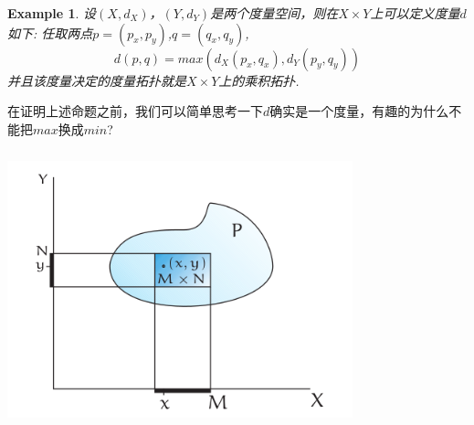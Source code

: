 \documentclass{article}
\newtheorem{example}[theorem]{Example}
\begin{document}
\begin{example}
设$(X,d_X)$，$(Y,d_Y)$是两个度量空间，则在$X \times Y$上可以定义度量$d$如下: 任取两点$p=(p_x,p_y)$,$q=(q_x,q_y)$,\[d(p,q)=max(d_X(p_x,q_x),d_Y(p_y,q_y))\]并且该度量决定的度量拓扑就是$X \times Y$上的乘积拓扑.
\end{example}

在证明上述命题之前，我们可以简单思考一下$d$确实是一个度量，有趣的为什么不能把$max$换成$min$?

\begin{center}
\includegraphics[width=10cm, height=8cm]{images/product_topology.png}
\end{center}

\end{document}
